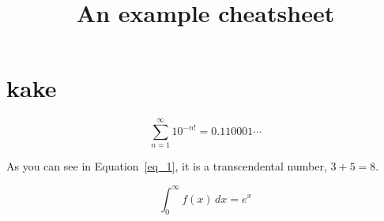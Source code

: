\documentclass{cheatsheet}
\title{An example cheatsheet}
\begin{document}
\maketitle

\section{kake}

\lipsum[1-1]

\begin{equation}
	\sum_{n=1}^\infty 10^{-n!}=0.110001\cdots\label{eq_1}
\end{equation}

As you can see in Equation~\ref{eq_1}, it is a transcendental number, $3 + 5 = 8$.

\[ \int_0^\infty f(x)\, dx = e^x \]

\lipsum[1-1]

\lipsum[3-50]
\end{document}
